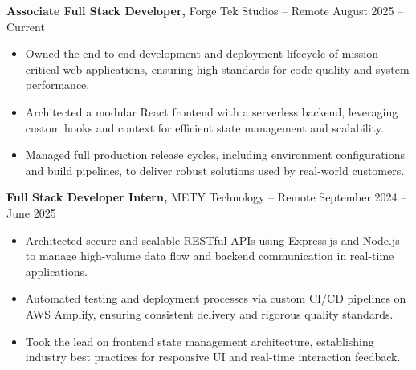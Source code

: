 \documentclass[11pt]{article}       %
\begin{document}
\textbf{Associate Full Stack Developer,} {Forge Tek Studios} -- Remote \hfill August 2025 -- Current 
\vspace{-9pt}
\begin{itemize}
  \item Owned the end-to-end development and deployment lifecycle of mission-critical web applications, ensuring high standards for code quality and system performance.
  \item Architected a modular React frontend with a serverless backend, leveraging custom hooks and context for efficient state management and scalability.
  \item Managed full production release cycles, including environment configurations and build pipelines, to deliver robust solutions used by real-world customers.
\end{itemize}

\textbf{Full Stack Developer Intern,} {METY Technology} -- Remote \hfill September 2024 -- June 2025 
\vspace{-9pt}
\begin{itemize}
  \item Architected secure and scalable RESTful APIs using Express.js and Node.js to manage high-volume data flow and backend communication in real-time applications.
  \item Automated testing and deployment processes via custom CI/CD pipelines on AWS Amplify, ensuring consistent delivery and rigorous quality standards.
  \item Took the lead on frontend state management architecture, establishing industry best practices for responsive UI and real-time interaction feedback.
\end{itemize}

\end{document}
